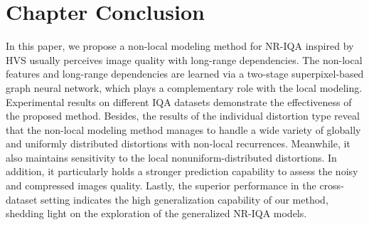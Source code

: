\section{Chapter Conclusion}
In this paper, we propose a non-local modeling method for NR-IQA inspired by HVS usually perceives image quality with long-range dependencies. The non-local features and long-range dependencies are learned via a two-stage superpixel-based graph neural network, which plays a complementary role with the local modeling. Experimental results on different IQA datasets demonstrate the effectiveness of the proposed method. Besides, the results of the individual distortion type reveal that the non-local modeling method manages to handle a wide variety of globally and uniformly distributed distortions with non-local recurrences. Meanwhile, it also maintains sensitivity to the local nonuniform-distributed distortions. In addition, it particularly holds a stronger prediction capability to assess the noisy and compressed images quality. Lastly, the superior performance in the cross-dataset setting indicates the high generalization capability of our method, shedding light on the exploration of the generalized NR-IQA models.